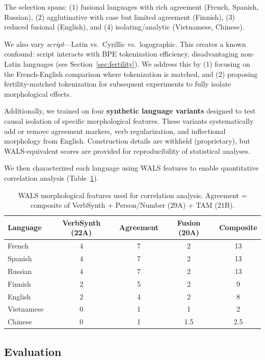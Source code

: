 \documentclass[11pt]{article}
\begin{document}
The selection spans: (1) fusional languages with rich agreement (French, Spanish, Russian), (2) agglutinative with case but limited agreement (Finnish), (3) reduced fusional (English), and (4) isolating/analytic (Vietnamese, Chinese).

We also vary \textit{script}—Latin vs.\ Cyrillic vs.\ logographic. This creates a known confound: script interacts with BPE tokenization efficiency, disadvantaging non-Latin languages (see Section~\ref{sec:fertility}). We address this by (1) focusing on the French-English comparison where tokenization is matched, and (2) proposing fertility-matched tokenization for subsequent experiments to fully isolate morphological effects.

Additionally, we trained on four \textbf{synthetic language variants} designed to test causal isolation of specific morphological features. These variants systematically add or remove agreement markers, verb regularization, and inflectional morphology from English. Construction details are withheld (proprietary), but WALS-equivalent scores are provided for reproducibility of statistical analyses.

We then characterized each language using WALS features to enable quantitative correlation analysis (Table~\ref{tab:wals}).

\begin{table}[h]
\centering
\begin{tabular}{lcccc}
\toprule
Language & VerbSynth (22A) & Agreement & Fusion (20A) & Composite \\
\midrule
French & 4 & 7 & 2 & 13 \\
Spanish & 4 & 7 & 2 & 13 \\
Russian & 4 & 7 & 2 & 13 \\
Finnish & 2 & 5 & 2 & 9 \\
English & 2 & 4 & 2 & 8 \\
Vietnamese & 0 & 1 & 1 & 2 \\
Chinese & 0 & 1 & 1.5 & 2.5 \\
\bottomrule
\end{tabular}
\caption{WALS morphological features used for correlation analysis. Agreement = composite of VerbSynth + Person/Number (29A) + TAM (21B).}
\label{tab:wals}
\end{table}

\subsection{Evaluation}
\end{document}
